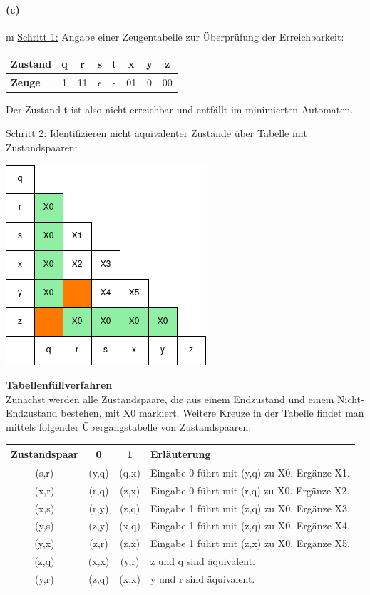 \paragraph{(c)}m
	\underline{Schritt 1:} Angabe einer Zeugentabelle zur Überprüfung der Erreichbarkeit:

	\begin{tabular}{l|ccccccc}
		\textbf{Zustand} & q & r  & s          & t & x  & y & z \\
		\hline
		\textbf{Zeuge}   & 1 & 11 & $\epsilon$ & - & 01 & 0 & 00 \\
	\end{tabular} 
	
	Der Zustand t ist also nicht erreichbar und entfällt im minimierten Automaten.
	
	\underline{Schritt 2:} Identifizieren nicht äquivalenter Zustände über Tabelle mit Zustandspaaren:
	
	\includegraphics[scale=0.6]{sol/thinf/f23t2/Tabellenfuellverfahren}

	\textbf{Tabellenfüllverfahren} \\
	Zunächst werden alle Zustandspaare, die aus einem Endzustand und einem Nicht-Endzustand bestehen, mit X0 markiert. Weitere Kreuze in der Tabelle findet man mittels folgender Übergangstabelle von Zustandspaaren:

	\begin{tabular}{c|c|c|l}
		\textbf{Zustandspaar} & \textbf{0} & \textbf{1} & \textbf{Erläuterung} \\
		\hline
		(s,r)                 & (y,q)      & (q,x)      & Eingabe 0 führt mit (y,q) zu X0. Ergänze X1. \\
		\hline
		(x,r)                 & (r,q)      & (z,x)      & Eingabe 0 führt mit (r,q) zu X0. Ergänze X2. \\
		\hline
		(x,s)                 & (r,y)      & (z,q)      & Eingabe 1 führt mit (z,q) zu X0. Ergänze X3. \\
		\hline
		(y,s)                 & (z,y)      & (x,q)      & Eingabe 1 führt mit (z,q) zu X0. Ergänze X4. \\
		\hline
		(y,x)                 & (z,r)      & (z,x)      & Eingabe 1 führt mit (z,x) zu X0. Ergänze X5. \\
		\hline
		(z,q)                 & (x,x)      & (y,r)      & z und q sind äquivalent. \\
		\hline 		
		(y,r)                 & (z,q)      & (x,x)      & y und r sind äquivalent. \\
	\end{tabular} 
	
